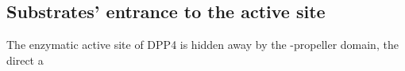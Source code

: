 \subsection{Substrates' entrance to the active site}

The enzymatic active site of DPP4 is hidden away by the \beta-propeller domain, the direct a